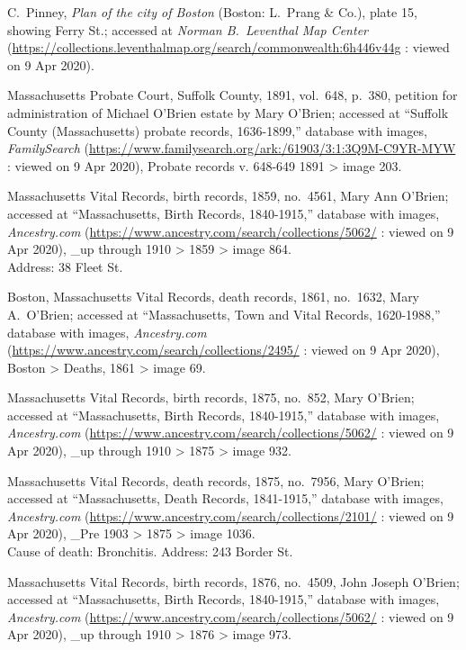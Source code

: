 \begin{thebibliography}{999}
C.\ Pinney, \textit{Plan of the city of Boston} (Boston: L.\ Prang \& Co.), plate 15, showing Ferry St.; accessed at \textit{Norman B.\ Leventhal Map Center} (\url{https://collections.leventhalmap.org/search/commonwealth:6h446v44g} : viewed on 9 Apr 2020).	

Massachusetts Probate Court, Suffolk County, 1891, vol.\ 648, p.\ 380, petition for administration of Michael O'Brien estate by Mary O'Brien; accessed at ``Suffolk County (Massachusetts) probate records, 1636-1899,'' database with images, \textit{FamilySearch} (\url{https://www.familysearch.org/ark:/61903/3:1:3Q9M-C9YR-MYW} : viewed on 9 Apr 2020), Probate records v. 648-649 1891 > image 203.

Massachusetts Vital Records, birth records, 1859, no.\ 4561, Mary Ann O'Brien; accessed at ``Massachusetts, Birth Records, 1840-1915,'' database with images, \textit{Ancestry.com} (\url{https://www.ancestry.com/search/collections/5062/} : viewed on 9 Apr 2020), \_up through 1910 > 1859 > image 864.\\
Address: 38 Fleet St.

Boston, Massachusetts Vital Records, death records, 1861, no.\ 1632, Mary A.\ O'Brien; accessed at ``Massachusetts, Town and Vital Records, 1620-1988,'' database with images, \textit{Ancestry.com} (\url{https://www.ancestry.com/search/collections/2495/} : viewed on 9 Apr 2020), Boston > Deaths, 1861 > image 69.

Massachusetts Vital Records, birth records, 1875, no.\ 852, Mary O'Brien; accessed at ``Massachusetts, Birth Records, 1840-1915,'' database with images, \textit{Ancestry.com} (\url{https://www.ancestry.com/search/collections/5062/} : viewed on 9 Apr 2020), \_up through 1910 > 1875 > image 932.

Massachusetts Vital Records, death records, 1875, no.\ 7956, Mary O'Brien; accessed at ``Massachusetts, Death Records, 1841-1915,'' database with images, \textit{Ancestry.com} (\url{https://www.ancestry.com/search/collections/2101/} : viewed on 9 Apr 2020), \_Pre 1903 > 1875 > image 1036.\\
Cause of death: Bronchitis. Address: 243 Border St.

Massachusetts Vital Records, birth records, 1876, no.\ 4509, John Joseph O'Brien; accessed at ``Massachusetts, Birth Records, 1840-1915,'' database with images, \textit{Ancestry.com} (\url{https://www.ancestry.com/search/collections/5062/} : viewed on 9 Apr 2020), \_up through 1910 > 1876 > image 973.


\end{thebibliography}
